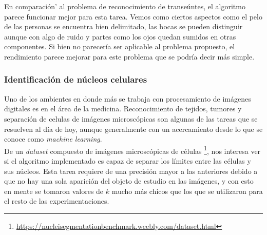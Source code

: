 \vspace{-7mm}

\indent En comparaci\'on' al problema de reconocimiento de transeúntes, el algoritmo parece funcionar mejor para esta tarea. Vemos como ciertos aspectos como el pelo de las personas se encuentra bien delimitado, las bocas se pueden distinguir aunque con algo de ruido y partes como los ojos quedan sumidos en otras componentes. Si bien no parecer\'ia ser aplicable al problema propuesto, el rendimiento parece mejorar para este problema que se podr\'ia decir m\'as simple.  


\subsubsection{Identificaci\'on de núcleos celulares}
Uno de los ambientes en donde m\'as se trabaja con procesamiento de im\'agenes digitales es en el \'area de la medicina.  Reconocimiento de tejidos, tumores y separaci\'on de celulas de im\'agenes microscópicas son algunas de las tareas que se resuelven al d\'ia de hoy, aunque generalmente con un acercamiento desde lo que se conoce como \textit{machine learning}. \\
\indent De un \textit{dataset} compuesto de im\'agenes microscópicas de células \footnote{\url{https://nucleisegmentationbenchmark.weebly.com/dataset.html}}, nos interesa ver si el algoritmo implementado es capaz de separar los l\'imites entre las células y sus n\'ucleos. Esta tarea requiere de una precisi\'on mayor a las anteriores debido a que no hay una sola aparici\'on del objeto de estudio en las im\'agenes, y con esto en mente se tomaron valores de $k$ mucho m\'as chicos que los que se utilizaron para el resto de las experimentaciones.
